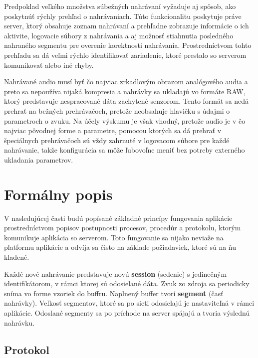 Predpoklad veľkého množstva súbežných nahrávaní vyžaduje aj spôsob, ako poskytnúť rýchly prehľad o nahrávaniach. Túto funkcionalitu poskytuje práve server, ktorý obsahuje zoznam nahrávaní a prehľadne zobrazuje informácie o ich aktivite, logovacie súbory z nahrávania a aj možnosť stiahnutia posledného nahraného segmentu pre overenie korektnosti nahrávania. Prostredníctvom tohto prehľadu sa dá veľmi rýchlo identifikovať zariadenie, ktoré prestalo so serverom komunikovať alebo iné chyby.

Nahrávané audio musí byť čo najviac zrkadlovým obrazom analógového audia a preto sa nepoužíva nijaká kompresia a nahrávky sa ukladajú vo formáte RAW, ktorý predstavuje nespracované dáta zachytené senzorom. Tento formát sa nedá prehrať na bežných prehrávačoch, pretože neobsahuje hlavičku s údajmi o parametroch o zvuku. Na účely výskumu je však vhodný, pretože audio je v čo najviac pôvodnej forme a parametre, pomocou ktorých sa dá prehrať v špeciálnych prehrávačoch sú vždy zahrnuté v logovacom súbore pre každé nahrávanie, takže konfigurácia sa môže ľubovoľne meniť bez potreby externého ukladania parametrov.

\section{Formálny popis}

V nasledujúcej časti budú popísané základné princípy fungovania aplikácie prostredníctvom popisov postupnosti procesov, procedúr a protokolu, ktorým komunikuje aplikácia so serverom. Toto fungovanie sa nijako neviaže na platformu aplikácie a odvíja sa čisto na základe požiadaviek, ktoré sú na ňu kladené. 

Každé nové nahrávanie predstavuje novú \textbf{session} (sedenie) s jedinečným identifikátorom, v rámci ktorej sú odosielané dáta. Zvuk zo zdroja sa periodicky sníma vo forme vzoriek do buffru. Naplnený buffer tvorí \textbf{segment} (časť nahrávky). Veľkosť segmentov, ktoré sa po sieti odosielajú je nastaviteľná v rámci aplikácie. Odoslané segmenty sa po príchode na server spájajú a tvoria výslednú nahrávku.


\subsection{Protokol}
\label{protokol}

